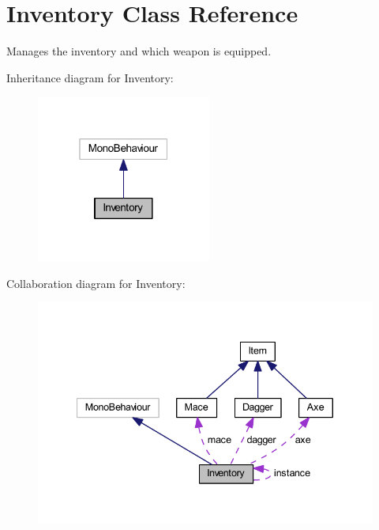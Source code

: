 \hypertarget{class_inventory}{}\section{Inventory Class Reference}
\label{class_inventory}


Manages the inventory and which weapon is equipped.  




Inheritance diagram for Inventory\+:\nopagebreak
\begin{figure}[H]
\begin{center}
\leavevmode
\includegraphics[width=163pt]{class_inventory__inherit__graph}
\end{center}
\end{figure}


Collaboration diagram for Inventory\+:\nopagebreak
\begin{figure}[H]
\begin{center}
\leavevmode
\includegraphics[width=340pt]{class_inventory__coll__graph}
\end{center}
\end{figure}
